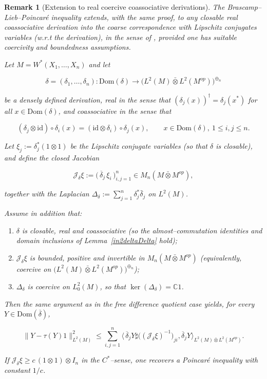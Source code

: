 \documentclass[10pt,a4paper,reqno]{amsart}
\newtheorem{remark}[theorem]{Remark}
\newcommand{\C}{\mathbb{C}}
\newcommand{\Dom}{\mathrm{Dom}}
\begin{document}
\begin{remark}[Extension to real coercive coassociative derivations]\label{coass}
The Brascamp--Lieb--Poincar\'e inequality extends, with the same proof, to any
closable real coassociative derivation into the coarse correspondence with Lipschitz conjugates variables (w.r.t the derivation), in the
sense of \cite[Section~2.2, Assumption~2.1]{Dab14}, provided one has suitable
coercivity and boundedness assumptions.

Let $M=W^\ast(X_1,\ldots,X_n)$ and let


\[
\delta=(\delta_1,\ldots,\delta_n):\Dom(\delta)\longrightarrow
\big(L^2(M)\bar\otimes L^2(M^{op})\big)^{\oplus_n}
\]


be a densely defined derivation, real in the sense that
$(\delta_j(x))^{\dagger}=\delta_j(x^\ast)$ for all $x\in\Dom(\delta)$, and
coassociative in the sense that


\[
(\delta_j\otimes \mathrm{id})\circ \delta_i(x)
=
(\mathrm{id}\otimes \delta_i)\circ\delta_j(x),
\qquad x\in\Dom(\delta),\ 1\le i,j\le n.
\]


Let $\xi_j:=\delta_j^\ast(1\otimes 1)$ be the Lipschitz conjugate variables (so that
$\delta$ is closable), and define the closed Jacobian


\[
\mathscr J_\delta\xi
:=
\big(\,\overline{\delta}_j\,\xi_i\,\big)_{i,j=1}^n
\in M_n(M\bar\otimes M^{op}),
\]


together with the Laplacian
\(
\Delta_\delta:=\sum_{j=1}^n \delta_j^\ast\bar\delta_j
\)
on $L^2(M)$.

Assume in addition that:
\begin{enumerate}
  \item $\delta$ is closable, real and coassociative (so the almost--commutation
        identities and domain inclusions of Lemma~\ref{in2deltaDelta} hold);
  \item $\mathscr J_\delta\xi$ is bounded, positive and invertible in
        $M_n(M\bar\otimes M^{op})$ (equivalently, coercive on
        $\big(L^2(M)\bar\otimes L^2(M^{op})\big)^{\oplus_n}$);
  \item $\Delta_\delta$ is coercive on $L^2_0(M)$, so that
        $\ker(\Delta_\delta)=\C 1$.
\end{enumerate}
Then the same argument as in the free difference quotient case yields, for every
$Y\in\Dom(\overline\delta)$,


\[
\|Y-\tau(Y)1\|_{L^2(M)}^2
\le
\sum_{i,j=1}^n 
\big\langle\,\overline{\delta}_j Y\sharp
\big((\mathscr{J}_\delta\xi)^{-1}\big)_{ji},
\overline{\delta}_j Y\big\rangle_{L^2(M)\bar\otimes L^2(M^{op})}.
\]

 If
$\mathscr J_\delta\xi\ge c\,(1\otimes 1)\otimes I_n$ in the $C^\ast$--sense,
one recovers a Poincar\'e inequality with constant $1/c$.
\end{remark}
\end{document}
